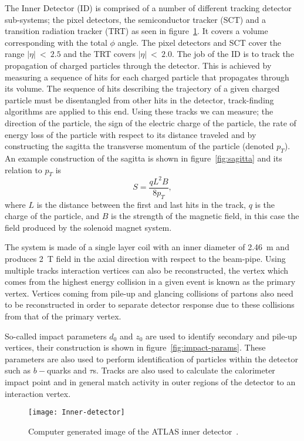 The Inner Detector (ID) is comprised of a number of different tracking detector
sub-systems; the pixel detectors, the semiconductor
tracker (SCT) and a transition radiation tracker (TRT) as seen in
figure~\ref{fig:ATLAS-inner-det}. It covers a volume corresponding with the
total $\phi$ angle. The pixel detectors and SCT cover the range $|\eta|~<~2.5$
and the TRT covers $|\eta|~<~2.0$. The job of the ID is to track the propagation
of charged particles through the detector. This is achieved by measuring a
sequence of hits for each charged particle that propagates through its volume.
The sequence of hits describing the trajectory of a given charged particle must
be disentangled from other hits in the detector, track-finding algorithms are
applied to this end. Using these tracks we can measure; the direction of the
particle, the sign of the electric charge of the particle, the rate of energy
loss of the particle with respect to its distance traveled and by constructing
the sagitta the transverse momentum of the particle (denoted $p_T$). An example
construction of the sagitta is shown in figure~\ref{fig:sagitta} and its relation
to $p_T$ is
\begin{equation}
  \label{eq:sagitta}
  S = \frac{qL^{2}B}{8p_{T}},
\end{equation}
where $L$ is the distance between the first and last hits in the track, $q$ is
the charge of the particle, and $B$ is the strength of the magnetic field, in
this case the field produced by the solenoid magnet system.

The system is made of a single layer coil with an inner diameter of 2.46~m  and
produces 2~T field in the axial direction with respect to the beam-pipe. Using
multiple tracks interaction vertices can also be reconstructed, the vertex which
comes from the highest energy collision in a given event is known as the primary
vertex. Vertices coming from pile-up and glancing collisions of partons also
need to be reconstructed in order to separate detector response due to these
collisions from that of the primary vertex.

So-called impact parameters $d_0$ and $z_0$ are used to identify secondary and
pile-up vertices, their construction is shown in figure~\ref{fig:impact-params}.
These parameters are also used to perform identification of particles within the
detector such as $b-$quarks and $\tau$s. Tracks are also used to calculate the
calorimeter impact point and in general match activity in outer regions of the
detector to an interaction vertex.
\begin{figure}[ht]
  \centering
  \texttt{[image: Inner-detector]}
  \caption[ATLAS inner detector]{Computer generated image of the ATLAS inner
    detector~\cite{ATLAS-inner-det}.}%
  \label{fig:ATLAS-inner-det}
\end{figure}

